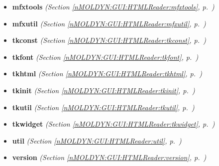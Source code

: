 \begin{itemize}
\setlength{\parskip}{0ex}
\item \textbf{mfxtools}
  \textit{(Section \ref{nMOLDYN:GUI:HTMLReader:mfxtools}, p.~\pageref{nMOLDYN:GUI:HTMLReader:mfxtools})}

\item \textbf{mfxutil}
  \textit{(Section \ref{nMOLDYN:GUI:HTMLReader:mfxutil}, p.~\pageref{nMOLDYN:GUI:HTMLReader:mfxutil})}

\item \textbf{tkconst}
  \textit{(Section \ref{nMOLDYN:GUI:HTMLReader:tkconst}, p.~\pageref{nMOLDYN:GUI:HTMLReader:tkconst})}

\item \textbf{tkfont}
  \textit{(Section \ref{nMOLDYN:GUI:HTMLReader:tkfont}, p.~\pageref{nMOLDYN:GUI:HTMLReader:tkfont})}

\item \textbf{tkhtml}
  \textit{(Section \ref{nMOLDYN:GUI:HTMLReader:tkhtml}, p.~\pageref{nMOLDYN:GUI:HTMLReader:tkhtml})}

\item \textbf{tkinit}
  \textit{(Section \ref{nMOLDYN:GUI:HTMLReader:tkinit}, p.~\pageref{nMOLDYN:GUI:HTMLReader:tkinit})}

\item \textbf{tkutil}
  \textit{(Section \ref{nMOLDYN:GUI:HTMLReader:tkutil}, p.~\pageref{nMOLDYN:GUI:HTMLReader:tkutil})}

\item \textbf{tkwidget}
  \textit{(Section \ref{nMOLDYN:GUI:HTMLReader:tkwidget}, p.~\pageref{nMOLDYN:GUI:HTMLReader:tkwidget})}

\item \textbf{util}
  \textit{(Section \ref{nMOLDYN:GUI:HTMLReader:util}, p.~\pageref{nMOLDYN:GUI:HTMLReader:util})}

\item \textbf{version}
  \textit{(Section \ref{nMOLDYN:GUI:HTMLReader:version}, p.~\pageref{nMOLDYN:GUI:HTMLReader:version})}

\end{itemize}

